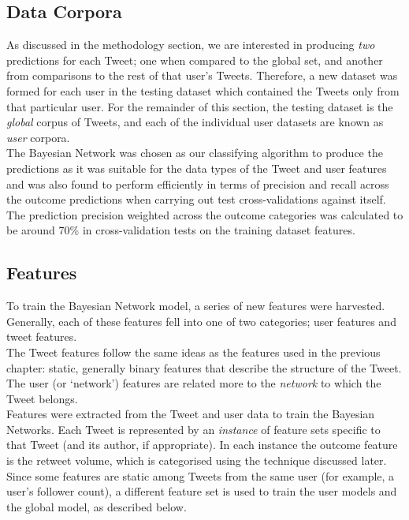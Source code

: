 \subsection{Data Corpora}
As discussed in the methodology section, we are interested in producing \textit{two} predictions for each Tweet; one when compared to the global set, and another from comparisons to the rest of that user's Tweets. Therefore, a new dataset was formed for each user in the testing dataset which contained the Tweets only from that particular user. For the remainder of this section, the testing dataset is the \textit{global} corpus of Tweets, and each of the individual user datasets are known as \textit{user} corpora.\\
The Bayesian Network was chosen as our classifying algorithm to produce the predictions as it was suitable for the data types of the Tweet and user features and was also found to perform efficiently in terms of precision and recall across the outcome predictions when carrying out test cross-validations against itself. The prediction precision weighted across the outcome categories was calculated to be around 70\% in cross-validation tests on the training dataset features.

\subsection{Features}
To train the Bayesian Network model, a series of new features were harvested. Generally, each of these features fell into one of two categories; user features and tweet features.
\\
The Tweet features follow the same ideas as the features used in the previous chapter: static, generally binary features that describe the structure of the Tweet. The user (or `network')  features are related more to the \emph{network} to which the Tweet belongs.\\

Features were extracted from the Tweet and user data to train the Bayesian Networks. Each Tweet is represented by an \textit{instance} of feature sets specific to that Tweet (and its author, if appropriate). In each instance the outcome feature is the retweet volume, which is categorised using the technique discussed later.\\
Since some features are static among Tweets from the same user (for example, a user's follower count), a different feature set is used to train the user models and the global model, as described below.

